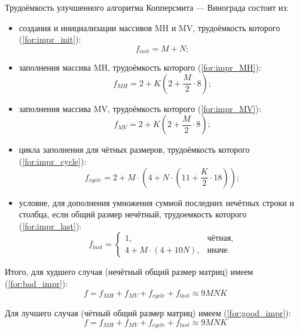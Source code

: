 \documentclass[a4paper,14pt, unknownkeysallowed]{extreport}
\begin{document}
Трудоёмкость улучшенного алгоритма Копперсмита — Винограда состоит из:
\begin{itemize}
	\item создания и инициализации массивов MH и MV, трудоёмкость которого (\ref{for:impr_init}):
	\begin{equation}
		\label{for:impr_init}
		f_{init} = M + N;
	\end{equation}
	
	\item заполнения массива MH, трудоёмкость которого (\ref{for:impr_MH}):
	\begin{equation}
		\label{for:impr_MH}
		f_{MH} =  2 + K (2 + \frac{M}{2} \cdot 8);
	\end{equation}
	
	\item заполнения массива MV, трудоёмкость которого (\ref{for:impr_MV}):
	\begin{equation}
		\label{for:impr_MV}
		f_{MV} =  2 + K (2 + \frac{M}{2} \cdot 8);
	\end{equation}
	
	\item цикла заполнения для чётных размеров, трудоёмкость которого (\ref{for:impr_cycle}):
	\begin{equation}
		\label{for:impr_cycle}
		f_{cycle} =2 + M \cdot (4 + N \cdot (11 + \frac{K}{2} \cdot 18));
	\end{equation}
	
	\item условие, для дополнения умножения суммой последних нечётных строки и столбца, если общий размер нечётный, трудоемкость которого (\ref{for:impr_last}):
	\begin{equation}
		\label{for:impr_last}
		f_{last} = 
		\begin{cases}
			1, & \text{чётная,}\\
			4 + M \cdot (4 + 10N), & \text{иначе.}
		\end{cases}
	\end{equation}
\end{itemize}

Итого, для худшего случая (нечётный общий размер матриц) имеем (\ref{for:bad_impr}):
\begin{equation}
	\label{for:bad_impr}
	f = f_{MH} + f_{MV} + f_{cycle} + f_{last} \approx 9MNK
\end{equation}

Для лучшего случая (чётный общий размер матриц) имеем (\ref{for:good_impr}):
\begin{equation}
	\label{for:good_impr}
	f = f_{MH} + f_{MV} + f_{cycle} + f_{last} \approx 9MNK
\end{equation}
\end{document}
